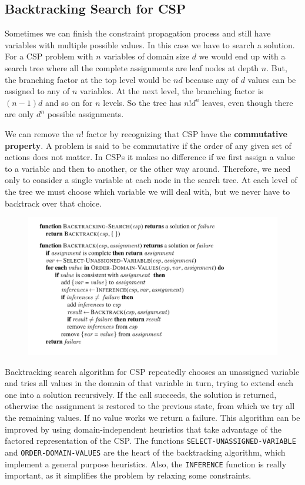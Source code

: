 \documentclass{article}
\newcommand{\code}{\lstinline}
\begin{document}
\subsection{Backtracking Search for CSP}
Sometimes we can finish the constraint propagation process and still have variables with multiple possible values. In this case we have to search a solution. For a CSP problem with $n$ variables of domain size $d$ we would end up with a search tree where all the complete assignments are leaf nodes at depth $n$. But, the branching factor at the top level would be $nd$ because any of $d$ values can be assigned to any of $n$ variables. At the next level, the branching factor is $(n-1)d$ and so on for $n$ levels. So the tree has $n!d^n$ leaves, even though there are only $d^n$ possible assignments.

We can remove the $n!$ factor by recognizing that CSP have the \textbf{commutative property}. A problem is said to be commutative if the order of any given set of actions does not matter. In CSPs it makes no difference if we first assign a value to a variable and then to another, or the other way around. Therefore, we need only to consider a single variable at each node in the search tree. At each level of the tree we must choose which variable we will deal with, but we never have to backtrack over that choice. 

\begin{figure}[h]
    \centering
    \includegraphics[width=1\linewidth]{algorithms/Backtracking Search for CSP.png}
    \label{fig:backtracking_search_for_CSP_algorithm}
\end{figure}

Backtracking search algorithm for CSP repeatedly chooses an unassigned variable and tries all values in the domain of that variable in turn, trying to extend each one into a solution recursively. If the call succeeds, the solution is returned, otherwise the assignment is restored to the previous state, from which we try all the remaining values. If no value works we return a failure. This algorithm can be improved by using domain-independent heuristics that take advantage of the factored representation of the CSP. The functions \code{SELECT-UNASSIGNED-VARIABLE} and \code{ORDER-DOMAIN-VALUES} are the heart of the backtracking algorithm, which implement a general purpose heuristics. Also, the \code{INFERENCE} function is really important, as it simplifies the problem by relaxing some constraints.
\end{document}
